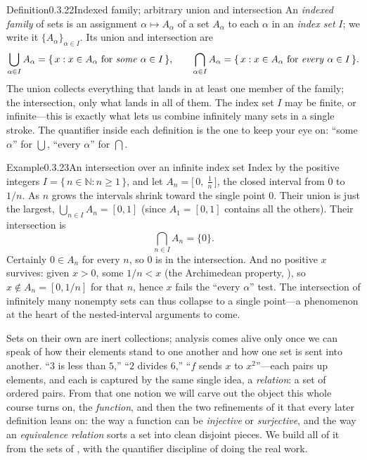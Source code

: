 \documentclass[main.tex]{subfiles}
\begin{document}
\begin{Obj}{Definition}{0.3.22}{Indexed family; arbitrary union and intersection}
An \emph{indexed family} of sets is an assignment $\alpha\mapsto A_{\alpha}$ of a set $A_{\alpha}$ to
each $\alpha$ in an \emph{index set} $I$; we write it $\{A_{\alpha}\}_{\alpha\in I}$. Its union and
intersection are
\[
\bigcup_{\alpha\in I}A_{\alpha}=\{\,x : x\in A_{\alpha}\ \text{for \emph{some} } \alpha\in I\,\},
\qquad
\bigcap_{\alpha\in I}A_{\alpha}=\{\,x : x\in A_{\alpha}\ \text{for \emph{every} } \alpha\in I\,\}.
\]
The union collects everything that lands in at least one member of the family; the intersection, only
what lands in all of them. The index set $I$ may be finite, or infinite---this is exactly what lets us
combine infinitely many sets in a single stroke. The quantifier inside each definition is the one to
keep your eye on: ``some $\alpha$'' for $\bigcup$, ``every $\alpha$'' for $\bigcap$.
\end{Obj}

\begin{ObjL}{Example}{0.3.23}{An intersection over an infinite index set}
Index by the positive integers $I=\{\,n\in\mathbb N : n\geq 1\,\}$, and let
$A_{n}=\bigl[\,0,\ \tfrac1n\,\bigr]$, the closed interval from $0$ to $1/n$. As $n$ grows the
intervals shrink toward the single point $0$. Their union is just the largest,
$\bigcup_{n\in I}A_{n}=[0,1]$ (since $A_{1}=[0,1]$ contains all the others). Their intersection is
\[
\bigcap_{n\in I}A_{n}=\{0\}.
\]
Certainly $0\in A_{n}$ for every $n$, so $0$ is in the intersection. And no positive $x$ survives:
given $x>0$, some $1/n<x$ (the Archimedean property, ), so $x\notin A_{n}=[0,1/n]$ for that
$n$, hence $x$ fails the ``every $\alpha$'' test. The intersection of infinitely many nonempty sets
can thus collapse to a single point---a phenomenon at the heart of the nested-interval arguments to
come.
\end{ObjL}
\clearpage

\noindent Sets on their own are inert collections; analysis comes alive only once we can speak of how
their elements stand to one another and how one set is sent into another. ``$3$ is less than $5$,''
``$2$ divides $6$,'' ``$f$ sends $x$ to $x^2$''---each pairs up elements, and each is captured by the
same single idea, a \emph{relation}: a set of ordered pairs. From that one notion we will carve out
the object this whole course turns on, the \emph{function}, and then the two refinements of it that
every later definition leans on: the way a function can be \emph{injective} or \emph{surjective}, and
the way an \emph{equivalence relation} sorts a set into clean disjoint pieces. We build all of it from
the sets of , with the quantifier discipline of  doing the real work.
\end{document}
